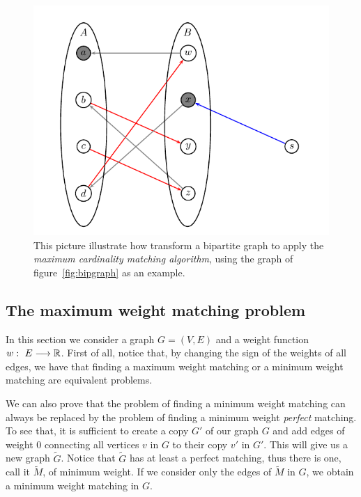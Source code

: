 \begin{figure}[htbp]
  \begin{center}
   \includegraphics{figures/augpath.pdf}
  \end{center}
    \caption{This picture illustrate how transform a bipartite
    graph to apply the \emph{maximum cardinality matching 
    algorithm}, using the graph of figure~\ref{fig:bipgraph} as
    an example.}
    \label{fig:augpath}
\end{figure}

\subsection{The maximum weight matching problem}
\label{subsec:maxwmat}

In this section we consider a graph $G=(V,E)$ and a weight 
function $w:~E\longrightarrow\mathbb{R}$. First of all, notice that,
by changing the sign of the weights of all edges, we have that 
finding a maximum weight matching or a minimum weight matching
are equivalent problems.
 
We can also prove 
that the problem of finding a minimum weight matching
can always be replaced by the problem of finding a minimum 
weight \emph{perfect} matching. To see that, it is 
sufficient to create a copy $G'$ of our graph $G$ and add
edges of weight $0$ connecting all vertices $v$ in $G$
to their copy $v'$ in $G'$. This will give us a new graph
$\tilde{G}$. Notice that $\tilde{G}$ has at least a perfect
matching, thus there is one, call it $\tilde{M}$, of minimum 
weight.
If we consider only the edges of $\tilde{M}$ in $G$, we obtain
a minimum weight matching in $G$.

